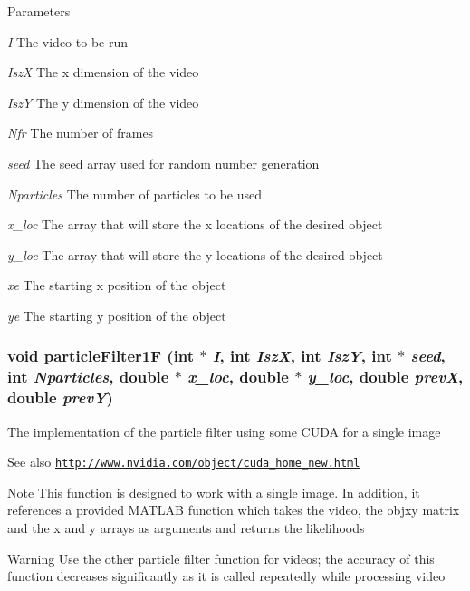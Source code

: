 \begin{DoxyParams}{Parameters}
\item[{\em I}]The video to be run \item[{\em IszX}]The x dimension of the video \item[{\em IszY}]The y dimension of the video \item[{\em Nfr}]The number of frames \item[{\em seed}]The seed array used for random number generation \item[{\em Nparticles}]The number of particles to be used \item[{\em x\_\-loc}]The array that will store the x locations of the desired object \item[{\em y\_\-loc}]The array that will store the y locations of the desired object \item[{\em xe}]The starting x position of the object \item[{\em ye}]The starting y position of the object \end{DoxyParams}
\hypertarget{ex__particle__CUDA__naive_8cu_a81e883a19beb30fd4ebe47acb98dbd0d}{
\subsubsection[{particleFilter1F}]{\setlength{\rightskip}{0pt plus 5cm}void particleFilter1F (int $\ast$ {\em I}, \/  int {\em IszX}, \/  int {\em IszY}, \/  int $\ast$ {\em seed}, \/  int {\em Nparticles}, \/  double $\ast$ {\em x\_\-loc}, \/  double $\ast$ {\em y\_\-loc}, \/  double {\em prevX}, \/  double {\em prevY})}}
\label{ex__particle__CUDA__naive_8cu_a81e883a19beb30fd4ebe47acb98dbd0d}
The implementation of the particle filter using some CUDA for a single image \begin{DoxySeeAlso}{See also}
\href{http://www.nvidia.com/object/cuda_home_new.html}{\tt http://www.nvidia.com/object/cuda\_\-home\_\-new.html} 
\end{DoxySeeAlso}
\begin{DoxyNote}{Note}
This function is designed to work with a single image. In addition, it references a provided MATLAB function which takes the video, the objxy matrix and the x and y arrays as arguments and returns the likelihoods 
\end{DoxyNote}
\begin{DoxyWarning}{Warning}
Use the other particle filter function for videos; the accuracy of this function decreases significantly as it is called repeatedly while processing video 
\end{DoxyWarning}


